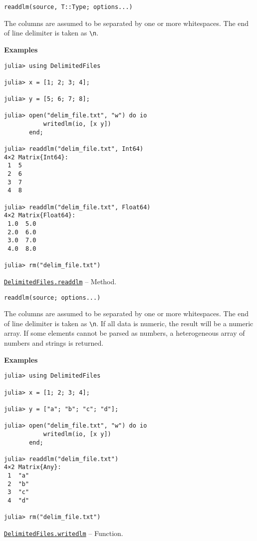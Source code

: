 \begin{adjustwidth}{2em}{0pt}


\begin{verbatim}
readdlm(source, T::Type; options...)
\end{verbatim}

The columns are assumed to be separated by one or more whitespaces. The end of line delimiter is taken as \texttt{{\textbackslash}n}.

\textbf{Examples}


\begin{verbatim}
julia> using DelimitedFiles

julia> x = [1; 2; 3; 4];

julia> y = [5; 6; 7; 8];

julia> open("delim_file.txt", "w") do io
           writedlm(io, [x y])
       end;

julia> readdlm("delim_file.txt", Int64)
4×2 Matrix{Int64}:
 1  5
 2  6
 3  7
 4  8

julia> readdlm("delim_file.txt", Float64)
4×2 Matrix{Float64}:
 1.0  5.0
 2.0  6.0
 3.0  7.0
 4.0  8.0

julia> rm("delim_file.txt")
\end{verbatim}



\end{adjustwidth}
\hypertarget{12553768345033130217}{}
\hyperlink{12553768345033130217}{\texttt{DelimitedFiles.readdlm}}  -- {Method.}

\begin{adjustwidth}{2em}{0pt}


\begin{verbatim}
readdlm(source; options...)
\end{verbatim}

The columns are assumed to be separated by one or more whitespaces. The end of line delimiter is taken as \texttt{{\textbackslash}n}. If all data is numeric, the result will be a numeric array. If some elements cannot be parsed as numbers, a heterogeneous array of numbers and strings is returned.

\textbf{Examples}


\begin{verbatim}
julia> using DelimitedFiles

julia> x = [1; 2; 3; 4];

julia> y = ["a"; "b"; "c"; "d"];

julia> open("delim_file.txt", "w") do io
           writedlm(io, [x y])
       end;

julia> readdlm("delim_file.txt")
4×2 Matrix{Any}:
 1  "a"
 2  "b"
 3  "c"
 4  "d"

julia> rm("delim_file.txt")
\end{verbatim}



\end{adjustwidth}
\hypertarget{18287165101716314167}{}
\hyperlink{18287165101716314167}{\texttt{DelimitedFiles.writedlm}}  -- {Function.}

